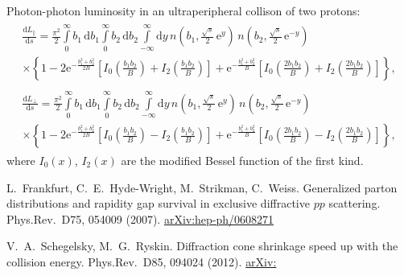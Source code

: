 \documentclass[a4paper,12pt]{article}
\begin{document}
Photon-photon luminosity in an ultraperipheral collison of two protons:
\begin{equation}
  \begin{gathered}
    \begin{multlined}
      \frac{\mathrm{d} L_\parallel}{\mathrm{d} s}
      = \frac{\pi^2}{2}
        \int\limits_0^\infty b_1 \, \mathrm{d} b_1
        \int\limits_0^\infty b_2 \, \mathrm{d} b_2
        \int\limits_{-\infty}^\infty \mathrm{d} y
        \, n \left( b_1, \tfrac{\sqrt{s}}{2} \, \mathrm{e}^y \right)
        \, n \left( b_2, \tfrac{\sqrt{s}}{2} \, \mathrm{e}^{-y} \right)
        \\  \times
        \left\{
            1
          - 2 \mathrm{e}^{-\frac{b_1^2 + b_2^2}{2 B}}
            \left[
                I_0 \left( \frac{b_1 b_2}{B} \right)
              + I_2 \left( \frac{b_1 b_2}{B} \right)
            \right]
          + \mathrm{e}^{-\frac{b_1^2 + b_2^2}{B}}
            \left[
                I_0 \left( \frac{2 b_1 b_2}{B} \right)
              + I_2 \left( \frac{2 b_1 b_2}{B} \right)
            \right]
        \right\},
    \end{multlined}
    \\
    \begin{multlined}
      \frac{\mathrm{d} L_\perp}{\mathrm{d} s}
      = \frac{\pi^2}{2}
        \int\limits_0^\infty b_1 \, \mathrm{d} b_1
        \int\limits_0^\infty b_2 \, \mathrm{d} b_2
        \int\limits_{-\infty}^\infty \mathrm{d} y
        \, n \left( b_1, \tfrac{\sqrt{s}}{2} \, \mathrm{e}^y \right)
        \, n \left( b_2, \tfrac{\sqrt{s}}{2} \, \mathrm{e}^{-y} \right)
        \\  \times
        \left\{
            1
          - 2 \mathrm{e}^{-\frac{b_1^2 + b_2^2}{2 B}}
            \left[
                I_0 \left( \frac{b_1 b_2}{B} \right)
              - I_2 \left( \frac{b_1 b_2}{B} \right)
            \right]
          + \mathrm{e}^{-\frac{b_1^2 + b_2^2}{B}}
            \left[
                I_0 \left( \frac{2 b_1 b_2}{B} \right)
              - I_2 \left( \frac{2 b_1 b_2}{B} \right)
            \right]
        \right\},
    \end{multlined}
  \end{gathered}
\end{equation}
where $I_0(x)$, $I_2(x)$ are the modified Bessel function of the first kind.

\newcommand{\arxiv}[1]{\href{http://arxiv.org/abs/#1}{arXiv:\nolinebreak[3]#1}}
\begin{thebibliography}{99}
  L.~Frankfurt, C.~E.~Hyde-Wright, M.~Strikman, C.~Weiss.
  Generalized parton distributions and rapidity gap survival in exclusive diffractive $p p$ scattering.
  Phys.Rev.~D75, 054009 (2007).
  \href{http://arxiv.org/abs/hep-ph/0608271}{arXiv:\nolinebreak[3]hep-ph/0608271}

  V.~A.~Schegelsky, M.~G.~Ryskin.
  Diffraction cone shrinkage speed up with the collision energy.
  Phys.Rev.~D85, 094024 (2012).
  \arxiv{1112.3243}
\end{thebibliography}
\end{document}
